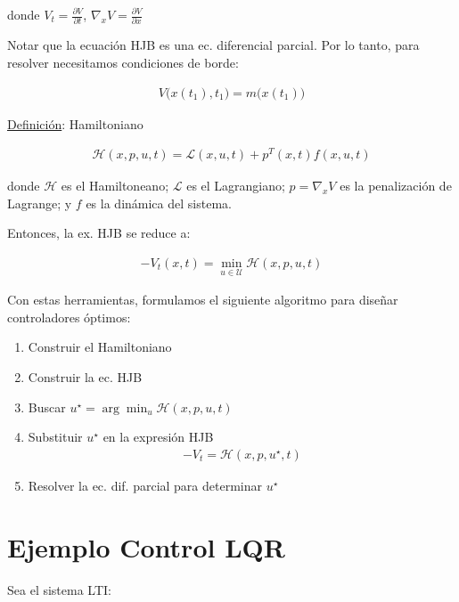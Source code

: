donde $V_t=\frac{\partial V}{\partial t}$, $\nabla_x V=\frac{\partial V}{\partial x}$ \\

\par Notar que la ecuación HJB es una ec. diferencial parcial. Por lo tanto, para resolver necesitamos condiciones de borde:

\begin{align*}
    V\big(x(t_1),t_1\big)=m\big(x(t_1)\big)
\end{align*}

\underline{Definición}: Hamiltoniano

\begin{align*}
    \mathcal{H}(x,p,u,t) = \mathcal{L}(x,u,t) + p^T(x,t) f(x,u,t)
\end{align*}

donde $\mathcal{H}$ es el Hamiltoneano; $\mathcal{L}$ es el Lagrangiano; $p = \nabla_x V$ es la penalización de Lagrange; y $f$ es la dinámica del sistema.\\

\par Entonces, la ex. HJB se reduce a:

\begin{align*}
    -V_t(x,t)=\min_{u \in \mathcal{U}} \mathcal{H}(x,p,u,t)
\end{align*}

Con estas herramientas, formulamos el siguiente algoritmo para diseñar controladores óptimos:

\begin{enumerate}
    \item Construir el Hamiltoniano
    \item Construir la ec. HJB
    \item Buscar $u^\star = \arg \min_u \mathcal{H}(x,p,u,t)$
    \item Substituir $u^\star$ en la expresión HJB
    \begin{align*}
        -V_t = \mathcal{H}(x,p,u^\star,t)
    \end{align*}
    \item Resolver la ec. dif. parcial para determinar $u^\star$
\end{enumerate}

\section{Ejemplo Control LQR}

Sea el sistema LTI:

